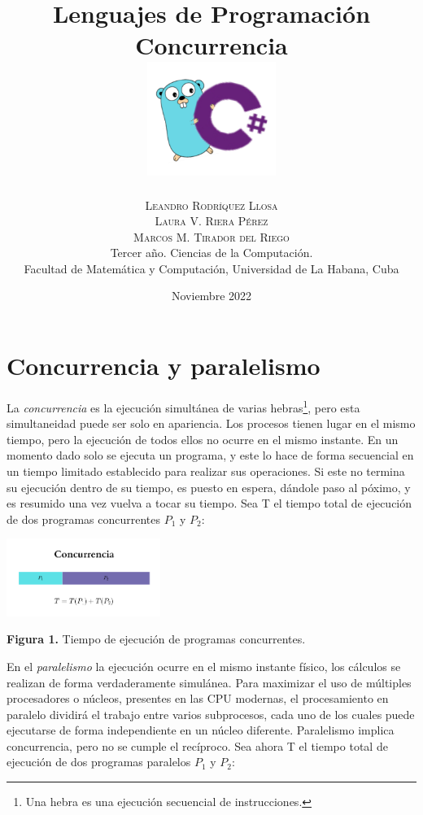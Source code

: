 \documentclass[10pt]{article} %
\title{\normalsize{Lenguajes de Programaci\'on}\\
\Huge\bfseries Concurrencia\\
\includegraphics[height=5em]{go_cs_logo.png}} %
\author{%
\normalsize\textsc{Leandro Rodr\'iquez Llosa}\\
\normalsize\textsc{Laura V. Riera P\'erez}\\ 
\normalsize\textsc{Marcos M. Tirador del Riego} \\[2ex]
\small Tercer a\~no. Ciencias de la Computaci\'on. \\ %
\small Facultad de Matem\'atica y Computaci\'on, Universidad de La Habana, Cuba \\ %
}
\date{\footnotesize Noviembre 2022 } %
\newcommand{\imgcaption}[2]{\tiny \textbf{Figura #1.} #2.}
\begin{document}
\maketitle


\section{Concurrencia y paralelismo}

La \textit{concurrencia} es la ejecuci\'on simult\'anea de varias hebras\footnote{Una hebra es una ejecuci\'on secuencial de instrucciones.}, pero esta simultaneidad puede ser solo en apariencia. Los procesos tienen lugar en el mismo tiempo, pero la ejecución de todos ellos no ocurre en el mismo instante. En un momento dado solo se ejecuta un programa, y este lo hace de forma secuencial en un tiempo limitado establecido para realizar sus operaciones. Si este no termina su ejecuci\'on dentro de su tiempo, es puesto en espera, d\'andole paso al p\'oximo, y es resumido una vez vuelva a tocar su tiempo. Sea T el tiempo total de ejecuci\'on de dos programas concurrentes $ P_{1} $ y $ P_{2} $: 

\begin{center}
	\includegraphics[width=5cm]{concurrencia.png}
	
	\imgcaption{1}{Tiempo de ejecuci\'on de programas concurrentes}
\end{center}

En el \textit{paralelismo} la ejecución ocurre en el mismo instante físico, los c\'alculos se realizan de forma verdaderamente simul\'anea. Para maximizar el uso de múltiples procesadores o n\'ucleos, presentes en las CPU modernas, el procesamiento en paralelo dividirá el trabajo entre varios subprocesos, cada uno de los cuales puede ejecutarse de forma independiente en un núcleo diferente. Paralelismo implica concurrencia, pero no se cumple el rec\'iproco. Sea ahora T el tiempo total de ejecuci\'on de dos programas paralelos $ P_{1} $ y $ P_{2} $:
\end{document}
